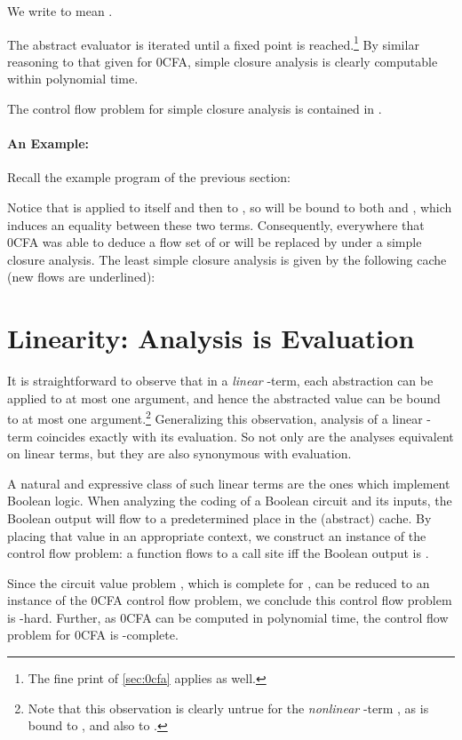 We write  to mean
.


The abstract evaluator  is iterated until a fixed point
is reached.\footnote{The fine print of \autoref{sec:0cfa} applies as
well.}  By similar reasoning to that given for 0CFA, simple closure
analysis is clearly computable within polynomial time.

\begin{lemma}
The control flow problem for simple closure analysis is contained in \ptime.
\end{lemma}

\paragraph{An Example:}

Recall the example program of the previous section:


Notice that  is applied to itself and then to , so  will be bound to both  and ,
which induces an equality between these two terms.  Consequently,
everywhere that 0CFA was able to deduce a flow set of  or  will be replaced by  under a simple closure analysis.  The least simple closure
analysis is given by the following cache (new flows are underlined):


\section{Linearity: Analysis is Evaluation}
\label{sec:linearity}

It is straightforward to observe that in a {\em linear}
-term, each abstraction  can be applied to at
most one argument, and hence the abstracted value can be bound to at
most one argument.\footnote{Note that this observation is clearly
untrue for the {\em nonlinear} -term , as  is bound to , and also to .}
Generalizing this observation, analysis of a linear -term
coincides exactly with its evaluation.  So not only are the analyses
equivalent on linear terms, but they are also synonymous with
evaluation.

A natural and expressive class of such linear terms are the ones which
implement Boolean logic.  When analyzing the coding of a Boolean
circuit and its inputs, the Boolean output will flow to a
predetermined place in the (abstract) cache.  By placing that value in
an appropriate context, we construct an instance of the control flow
problem: a function  flows to a call site  iff the Boolean
output is .

Since the circuit value problem \cite{ladner-75}, which is complete
for \ptime, can be reduced to an instance of the 0CFA control flow
problem, we conclude this control flow problem is \ptime-hard.
Further, as 0CFA can be computed in polynomial time, the control flow
problem for 0CFA is \ptime-complete.


